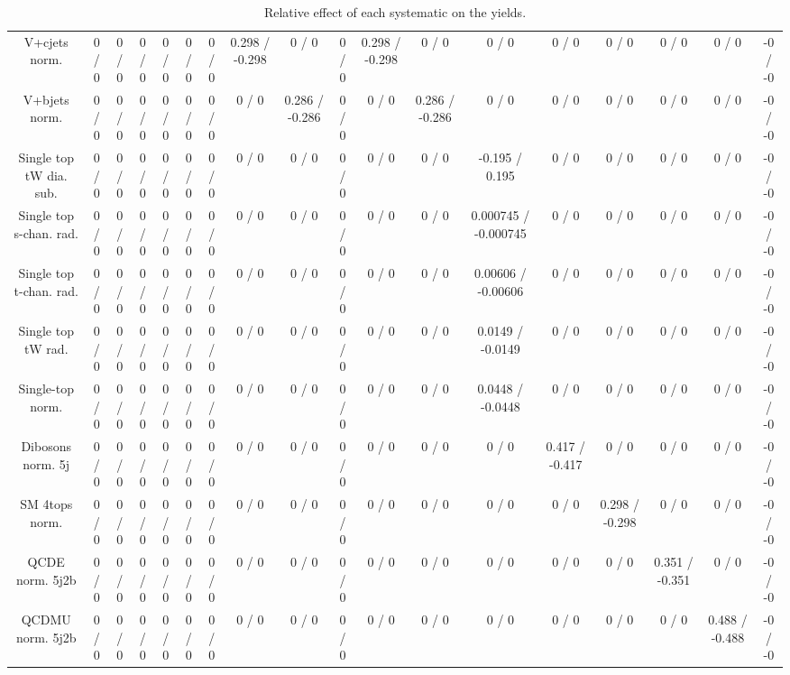 \documentclass[10pt]{article}
\begin{document}
\begin{table}[htbp]
\begin{center}
\begin{tabular}{|c|c|c|c|c|c|c|c|c|c|c|c|c|c|c|c|c|c|}
  V+cjets norm. & 0 / 0 & 0 / 0 & 0 / 0 & 0 / 0 & 0 / 0 & 0 / 0 & 0.298 / -0.298 & 0 / 0 & 0 / 0 & 0.298 / -0.298 & 0 / 0 & 0 / 0 & 0 / 0 & 0 / 0 & 0 / 0 & 0 / 0 & -0 / -0 \\ 
  V+bjets norm. & 0 / 0 & 0 / 0 & 0 / 0 & 0 / 0 & 0 / 0 & 0 / 0 & 0 / 0 & 0.286 / -0.286 & 0 / 0 & 0 / 0 & 0.286 / -0.286 & 0 / 0 & 0 / 0 & 0 / 0 & 0 / 0 & 0 / 0 & -0 / -0 \\ 
  Single top tW dia. sub. & 0 / 0 & 0 / 0 & 0 / 0 & 0 / 0 & 0 / 0 & 0 / 0 & 0 / 0 & 0 / 0 & 0 / 0 & 0 / 0 & 0 / 0 & -0.195 / 0.195 & 0 / 0 & 0 / 0 & 0 / 0 & 0 / 0 & -0 / -0 \\ 
  Single top s-chan. rad. & 0 / 0 & 0 / 0 & 0 / 0 & 0 / 0 & 0 / 0 & 0 / 0 & 0 / 0 & 0 / 0 & 0 / 0 & 0 / 0 & 0 / 0 & 0.000745 / -0.000745 & 0 / 0 & 0 / 0 & 0 / 0 & 0 / 0 & -0 / -0 \\ 
  Single top t-chan. rad. & 0 / 0 & 0 / 0 & 0 / 0 & 0 / 0 & 0 / 0 & 0 / 0 & 0 / 0 & 0 / 0 & 0 / 0 & 0 / 0 & 0 / 0 & 0.00606 / -0.00606 & 0 / 0 & 0 / 0 & 0 / 0 & 0 / 0 & -0 / -0 \\ 
  Single top tW rad. & 0 / 0 & 0 / 0 & 0 / 0 & 0 / 0 & 0 / 0 & 0 / 0 & 0 / 0 & 0 / 0 & 0 / 0 & 0 / 0 & 0 / 0 & 0.0149 / -0.0149 & 0 / 0 & 0 / 0 & 0 / 0 & 0 / 0 & -0 / -0 \\ 
  Single-top norm. & 0 / 0 & 0 / 0 & 0 / 0 & 0 / 0 & 0 / 0 & 0 / 0 & 0 / 0 & 0 / 0 & 0 / 0 & 0 / 0 & 0 / 0 & 0.0448 / -0.0448 & 0 / 0 & 0 / 0 & 0 / 0 & 0 / 0 & -0 / -0 \\ 
  Dibosons norm. 5j & 0 / 0 & 0 / 0 & 0 / 0 & 0 / 0 & 0 / 0 & 0 / 0 & 0 / 0 & 0 / 0 & 0 / 0 & 0 / 0 & 0 / 0 & 0 / 0 & 0.417 / -0.417 & 0 / 0 & 0 / 0 & 0 / 0 & -0 / -0 \\ 
  SM 4tops norm. & 0 / 0 & 0 / 0 & 0 / 0 & 0 / 0 & 0 / 0 & 0 / 0 & 0 / 0 & 0 / 0 & 0 / 0 & 0 / 0 & 0 / 0 & 0 / 0 & 0 / 0 & 0.298 / -0.298 & 0 / 0 & 0 / 0 & -0 / -0 \\ 
  QCDE norm. 5j2b & 0 / 0 & 0 / 0 & 0 / 0 & 0 / 0 & 0 / 0 & 0 / 0 & 0 / 0 & 0 / 0 & 0 / 0 & 0 / 0 & 0 / 0 & 0 / 0 & 0 / 0 & 0 / 0 & 0.351 / -0.351 & 0 / 0 & -0 / -0 \\ 
  QCDMU norm. 5j2b & 0 / 0 & 0 / 0 & 0 / 0 & 0 / 0 & 0 / 0 & 0 / 0 & 0 / 0 & 0 / 0 & 0 / 0 & 0 / 0 & 0 / 0 & 0 / 0 & 0 / 0 & 0 / 0 & 0 / 0 & 0.488 / -0.488 & -0 / -0 \\ 
\hline 
\end{tabular} 
\caption{Relative effect of each systematic on the yields.} 
\end{center} 
\end{table} 
\end{document}
